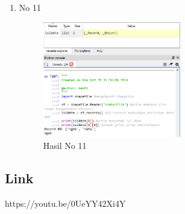 \begin{enumerate}
	\item No 11
	
	\begin{figure}[H]
		\includegraphics[width=6cm]{figures/Tugas3/1174083/pictureNo11.png}
		\centering
		\caption{Hasil No 11}
	\end{figure}
\end{enumerate}
\subsection{Link}
https://youtu.be/0UeYY42Xi4Y